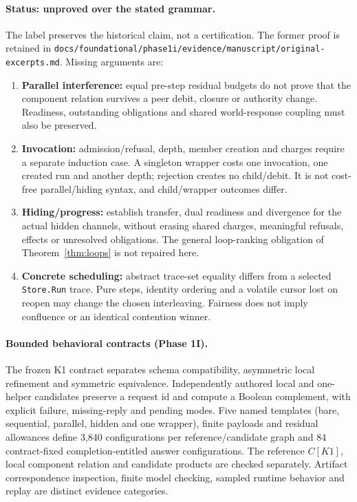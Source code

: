 \documentclass[11pt,a4paper]{article}
\theoremstyle{definition}
\theoremstyle{remark}
\begin{document}
\paragraph{Status: unproved over the stated grammar.} The label preserves the historical claim, not a certification. The former proof is retained in \texttt{docs/foundational/phase1i/evidence/manuscript/original-excerpts.md}. Missing arguments are:
\begin{enumerate}
\item \textbf{Parallel interference:} equal pre-step residual budgets do not prove that the component relation survives a peer debit, closure or authority change. Readiness, outstanding obligations and shared world-response coupling must also be preserved.
\item \textbf{Invocation:} admission/refusal, depth, member creation and charges require a separate induction case. A singleton wrapper costs one invocation, one created run and another depth; rejection creates no child/debit. It is not cost-free parallel/hiding syntax, and child/wrapper outcomes differ.
\item \textbf{Hiding/progress:} establish transfer, dual readiness and divergence for the actual hidden channels, without erasing shared charges, meaningful refusals, effects or unresolved obligations. The general loop-ranking obligation of Theorem~\ref{thm:loops} is not repaired here.
\item \textbf{Concrete scheduling:} abstract trace-set equality differs from a selected \texttt{Store.Run} trace. Pure steps, identity ordering and a volatile cursor lost on reopen may change the chosen interleaving. Fairness does not imply confluence or an identical contention winner.
\end{enumerate}

\paragraph{Bounded behavioral contracts (Phase 1I).} The frozen K1 contract separates schema compatibility, asymmetric local refinement and symmetric equivalence. Independently authored local and one-helper candidates preserve a request id and compute a Boolean complement, with explicit failure, missing-reply and pending modes. Five named templates (bare, sequential, parallel, hidden and one wrapper), finite payloads and residual allowances define 3,840 configurations per reference/candidate graph and 84 contract-fixed completion-entitled answer configurations. The reference $C[K1]$, local component relation and candidate products are checked separately. Artifact correspondence inspection, finite model checking, sampled runtime behavior and replay are distinct evidence categories.
\end{document}
